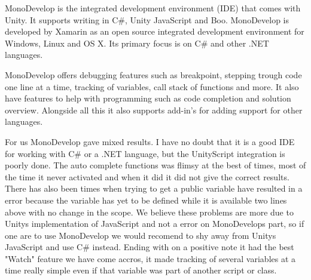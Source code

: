 MonoDevelop is the integrated development environment (IDE) that comes with Unity. It supports writing in C\#, Unity JavaScript and Boo.
MonoDevelop is developed by Xamarin \cite{xamarinRef} as an open source integrated development environment for Windows, Linux and OS X.
Its primary focus is on C\# and other .NET languages.


MonoDevelop offers debugging features such as breakpoint, stepping trough code one line at a time, tracking of variables, call stack of functions and more.
It also have features to help with programming such as code completion and solution overview. Alongside all this it also supports add-in's for adding support for other languages.


For us MonoDevelop gave mixed results. 
I have no doubt that it is a good IDE for working with C\# or a .NET language, but the UnityScript integration is poorly done.
The auto complete functions was flimsy at the best of times, most of the time it never activated and when it did it did not give the correct results. 
There has also been times when trying to get a public variable have resulted in a error because the variable has yet to be defined while it is available two lines above with no change in the scope.
We believe these problems are more due to Unitys implementation of JavaScript and not a error on MonoDevelops part, so if one are to use MonoDevelop we would recomend to shy away from Unitys JavaScript and use C\# instead.
Ending with on a positive note it had the best "Watch" feature we have come accros, it made tracking of several variables at a time really simple even if that variable was part of another script or class.	

